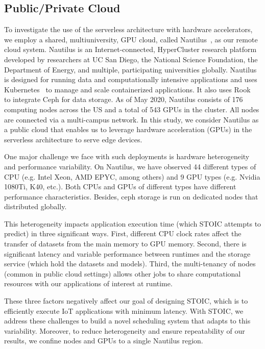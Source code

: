 \subsection{Public/Private Cloud}

To investigate the use of the serverless architecture with hardware
accelerators, we employ a shared, multiuniversity, GPU cloud, called
Nautilus~\cite{ref:nautilus}, as our remote cloud system. Nautilus is an
Internet-connected, HyperCluster research platform developed by researchers at
UC San Diego, the National Science Foundation, the Department of Energy, and
multiple, participating universities globally.  Nautilus is designed for
running data and computationally intensive applications and uses
Kubernetes~\cite{ref:k8s} to manage and scale containerized applications. It
also uses Rook~\cite{ref:rook} to integrate Ceph for data storage. As of May
2020, Nautilus consists of 176 computing nodes across the US and a total of
543 GPUs in the cluster. All nodes are connected via a multi-campus network.
In this study, we consider Nautilus as a public cloud that enables us to
leverage hardware acceleration (GPUs) in the serverless architecture to serve
edge devices. 

One major challenge we face with such deployments is hardware heterogeneity
and performance variability. On Nautilus, we have observed 44 different types
of CPU (e.g. Intel Xeon, AMD EPYC, among others) and 9 GPU types (e.g. Nvidia
1080Ti, K40, etc.). Both CPUs and GPUs of different types have different
performance characteristics. Besides, ceph storage is run on dedicated nodes
that distributed globally.

This heterogeneity impacts application execution time (which STOIC attempts to
predict) in three significant ways. First, different CPU clock rates affect
the transfer of datasets from the main memory to GPU memory. Second, there is
significant latency and variable performance between runtimes and the storage
service (which hold the datasets and models). Third, the multi-tenancy of
nodes (common in public cloud settings) allows other jobs to share
computational resources with our applications of interest at runtime. 

These three factors negatively affect our goal of designing STOIC, which is to
efficiently execute IoT applications with minimum latency. With STOIC, we
address these challenges to build a novel scheduling system that adapts to
this variability. Moreover, to reduce heterogeneity and ensure repeatability
of our results, we confine nodes and GPUs to a single Nautilus region.

